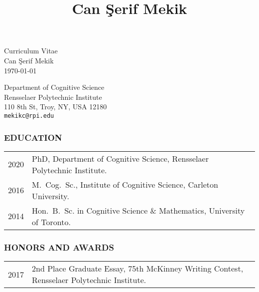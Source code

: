 \documentclass[12pt, letterpaper]{article}
\title{Can \c Serif Mekik}
\date{}
\begin{document}
\thispagestyle{empty}
\begin{center}
Curriculum Vitae\\
{\large Can \c Serif Mekik}\\
\today
\end{center}

\noindent Department of Cognitive Science\\
Rensselaer Polytechnic Institute\\
110 8th St, Troy, NY, USA 12180\\
\texttt{mekikc@rpi.edu}

\subsubsection*{EDUCATION}

\begin{longtable}{p{}p{}}
2020 & PhD, Department of Cognitive Science, Rensselaer Polytechnic Institute.\\
2016 & M.\ Cog.\ Sc., Institute of Cognitive Science, Carleton University.\\
2014 & Hon.\ B.\ Sc. in Cognitive Science \& Mathematics, University of Toronto.
\end{longtable}



\subsubsection*{HONORS AND AWARDS}
\begin{longtable}{p{}p{}}
2017 & 2nd Place Graduate Essay, 75th McKinney Writing Contest, Rensselaer Polytechnic Institute. \\
\end{longtable}
\end{document}
